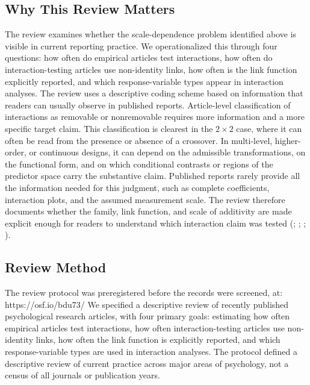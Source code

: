 \documentclass[
  man,
  longtable,
  nolmodern,
  notxfonts,
  notimes,
  colorlinks=true,linkcolor=blue,citecolor=blue,urlcolor=blue]{apa7}
\begin{document}
\subsection{Why This Review Matters}\label{why-this-review-matters}

The review examines whether the scale-dependence problem identified
above is visible in current reporting practice. We operationalized this
through four questions: how often do empirical articles test
interactions, how often do interaction-testing articles use non-identity
links, how often is the link function explicitly reported, and which
response-variable types appear in interaction analyses. The review uses
a descriptive coding scheme based on information that readers can
usually observe in published reports. Article-level classification of
interactions as removable or nonremovable requires more information and
a more specific target claim. This classification is clearest in the
\(2 \times 2\) case, where it can often be read from the presence or
absence of a crossover. In multi-level, higher-order, or continuous
designs, it can depend on the admissible transformations, on the
functional form, and on which conditional contrasts or regions of the
predictor space carry the substantive claim. Published reports rarely
provide all the information needed for this judgment, such as complete
coefficients, interaction plots, and the assumed measurement scale. The
review therefore documents whether the family, link function, and scale
of additivity are made explicit enough for readers to understand which
interaction claim was tested (;
;
;
).

\subsection{Review Method}\label{review-method}

The review protocol was preregistered before the records were screened,
at: https://osf.io/bdu73/ We specified a descriptive review of recently
published psychological research articles, with four primary goals:
estimating how often empirical articles test interactions, how often
interaction-testing articles use non-identity links, how often the link
function is explicitly reported, and which response-variable types are
used in interaction analyses. The protocol defined a descriptive review
of current practice across major areas of psychology, not a census of
all journals or publication years.
\end{document}
